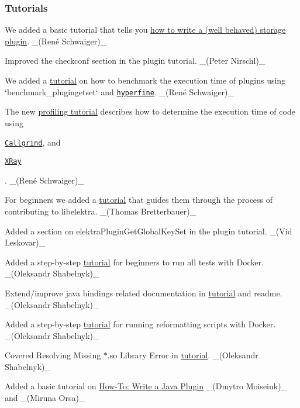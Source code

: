 \subsubsection*{Tutorials}


\begin{DoxyItemize}
\item We added a basic tutorial that tells you \hyperlink{doc_tutorials_storage-plugins_md}{how to write a (well behaved) storage plugin}. \+\_\+(René Schwaiger)\+\_\+
\item Improved the {\ttfamily checkconf} section in the plugin tutorial. \+\_\+(\+Peter Nirschl)\+\_\+
\item We added a \hyperlink{doc_tutorials_benchmarking_md}{tutorial} on how to benchmark the execution time of plugins using `benchmark\+\_\+plugingetset` and \href{https://github.com/sharkdp/hyperfine}{\tt hyperfine}. \+\_\+(René Schwaiger)\+\_\+
\item The new \hyperlink{doc_tutorials_profiling_md}{profiling tutorial} describes how to determine the execution time of code using
\begin{DoxyItemize}
\item \href{http://valgrind.org/docs/manual/cl-manual.html}{\tt Callgrind}, and
\item \href{https://llvm.org/docs/XRay.html}{\tt X\+Ray}
\end{DoxyItemize}

. \+\_\+(René Schwaiger)\+\_\+
\item For beginners we added a \hyperlink{doc_tutorials_contributing-clion_md}{tutorial} that guides them through the process of contributing to libelektra. \+\_\+(\+Thomas Bretterbauer)\+\_\+
\item Added a section on {\ttfamily elektra\+Plugin\+Get\+Global\+Key\+Set} in the plugin tutorial. \+\_\+(\+Vid Leskovar)\+\_\+
\item Added a step-\/by-\/step \hyperlink{doc_tutorials_run_all_tests_with_docker_md}{tutorial} for beginners to run all tests with Docker. \+\_\+(\+Oleksandr Shabelnyk)\+\_\+
\item Extend/improve java bindings related documentation in \hyperlink{doc_tutorials_java-kdb_md}{tutorial} and readme. \+\_\+(\+Oleksandr Shabelnyk)\+\_\+
\item Added a step-\/by-\/step \hyperlink{doc_tutorials_run_reformatting_script_with_docker_md}{tutorial} for running reformatting scripts with Docker. \+\_\+(\+Oleksandr Shabelnyk)\+\_\+
\item Covered Resolving Missing $\ast$.so Library Error in \hyperlink{doc_tutorials_contributing-clion_md}{tutorial}. \+\_\+(\+Oleksandr Shabelnyk)\+\_\+
\item Added a basic tutorial on \hyperlink{doc_tutorials_java-plugins_md}{How-\/\+To\+: Write a Java Plugin} \+\_\+(\+Dmytro Moiseiuk)\+\_\+ and \+\_\+(\+Miruna Orsa)\+\_\+
\end{DoxyItemize}

